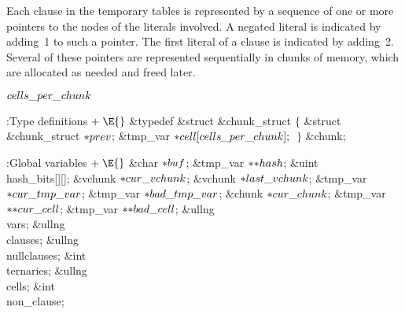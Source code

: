 Each clause in the temporary tables is represented by a
sequence of
one or more pointers to the  nodes of the literals involved.
A negated literal is indicated by adding~1 to such a pointer.
The first literal of a clause is indicated by adding~2.
Several of these pointers are represented sequentially in chunks
of memory, which are allocated as needed and freed later.

\Y\B\4\D$\\{cells\_per\_chunk}$ \5
\par
\Y\B\4:Type definitions\X${}\mathrel+\E{}$\6
\&{typedef} \&{struct} \&{chunk\_struct} ${}\{{}$\1\6
\&{struct} \&{chunk\_struct} ${}{*}\\{prev}{}$;\6
\&{tmp\_var} ${}{*}\\{cell}[\\{cells\_per\_chunk}];{}$\2\6
${}\}{}$ \&{chunk};\par
\fi

\B{}:Global variables\X${}\mathrel+\E{}$\6
\&{char} ${}{*}\\{buf}{}$;\6
\&{tmp\_var} ${}{*}{*}\\{hash}{}$;\6
\&{uint} \\{hash\_bits}[][];\6
\&{vchunk} ${}{*}\\{cur\_vchunk}{}$;\6
\&{vchunk} ${}{*}\\{last\_vchunk}{}$;\6
\&{tmp\_var} ${}{*}\\{cur\_tmp\_var}{}$;\6
\&{tmp\_var} ${}{*}\\{bad\_tmp\_var}{}$;\6
\&{chunk} ${}{*}\\{cur\_chunk}{}$;\6
\&{tmp\_var} ${}{*}{*}\\{cur\_cell}{}$;\6
\&{tmp\_var} ${}{*}{*}\\{bad\_cell}{}$;\6
\&{ullng} \\{vars};\6
\&{ullng} \\{clauses};\6
\&{ullng} \\{nullclauses};\6
\&{int} \\{ternaries};\6
\&{ullng} \\{cells};\6
\&{int} \\{non\_clause};\par
\fi

